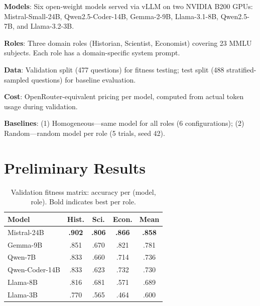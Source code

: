 \documentclass[sigconf,nonacm]{acmart}
\begin{document}
\textbf{Models}: Six open-weight models served via vLLM on two NVIDIA B200 GPUs: Mistral-Small-24B, Qwen2.5-Coder-14B, Gemma-2-9B, Llama-3.1-8B, Qwen2.5-7B, and Llama-3.2-3B.

\textbf{Roles}: Three domain roles (Historian, Scientist, Economist) covering 23 MMLU subjects. Each role has a domain-specific system prompt.

\textbf{Data}: Validation split (477 questions) for fitness testing; test split (488 stratified-sampled questions) for baseline evaluation.

\textbf{Cost}: OpenRouter-equivalent pricing per model, computed from actual token usage during validation.

\textbf{Baselines}: (1) Homogeneous---same model for all roles (6 configurations); (2) Random---random model per role (5 trials, seed 42).

\section{Preliminary Results}

\begin{table}[t]
\caption{Validation fitness matrix: accuracy per (model, role). Bold indicates best per role.}
\label{tab:fitness}
\centering
\small
\begin{tabular}{lcccc}
\toprule
Model & Hist. & Sci. & Econ. & Mean \\
\midrule
Mistral-24B & \textbf{.902} & \textbf{.806} & \textbf{.866} & \textbf{.858} \\
Gemma-9B & .851 & .670 & .821 & .781 \\
Qwen-7B & .833 & .660 & .714 & .736 \\
Qwen-Coder-14B & .833 & .623 & .732 & .730 \\
Llama-8B & .816 & .681 & .571 & .689 \\
Llama-3B & .770 & .565 & .464 & .600 \\
\bottomrule
\end{tabular}
\end{table}
\end{document}
